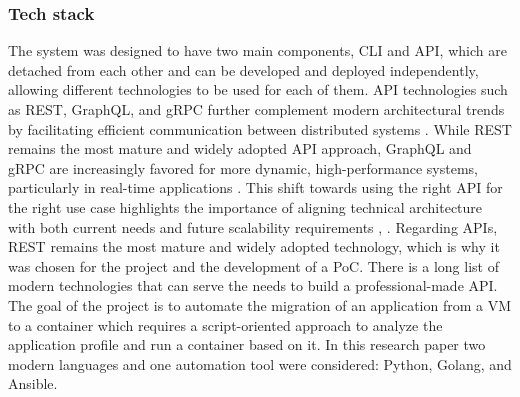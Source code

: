 \documentclass{article}
\begin{document}
\begin{multicols}{2}
\subsubsection{Tech stack}
The system was designed to have two main components, CLI and API, which are detached from each other and can be developed and deployed independently, allowing different technologies to be used for each of them. API technologies such as REST, GraphQL, and gRPC further complement modern architectural trends by facilitating efficient communication between distributed systems \cite{Ali-2024}. While REST remains the most mature and widely adopted API approach, GraphQL and gRPC are increasingly favored for more dynamic, high-performance systems, particularly in real-time applications \cite{Ali-2024}. This shift towards using the right API for the right use case highlights the importance of aligning technical architecture with both current needs and future scalability requirements \cite{Nivedhaa-2024}, \cite{Ali-2024}. Regarding APIs, REST remains the most mature and widely adopted technology, which is why it was chosen for the project and the development of a PoC. There is a long list of modern technologies that can serve the needs to build a professional-made API. The goal of the project is to automate the migration of an application from a VM to a container which requires a script-oriented approach to analyze the application profile and run a container based on it. In this research paper two modern languages and one automation tool were considered: Python, Golang, and Ansible. 

\end{multicols}
\end{document}
